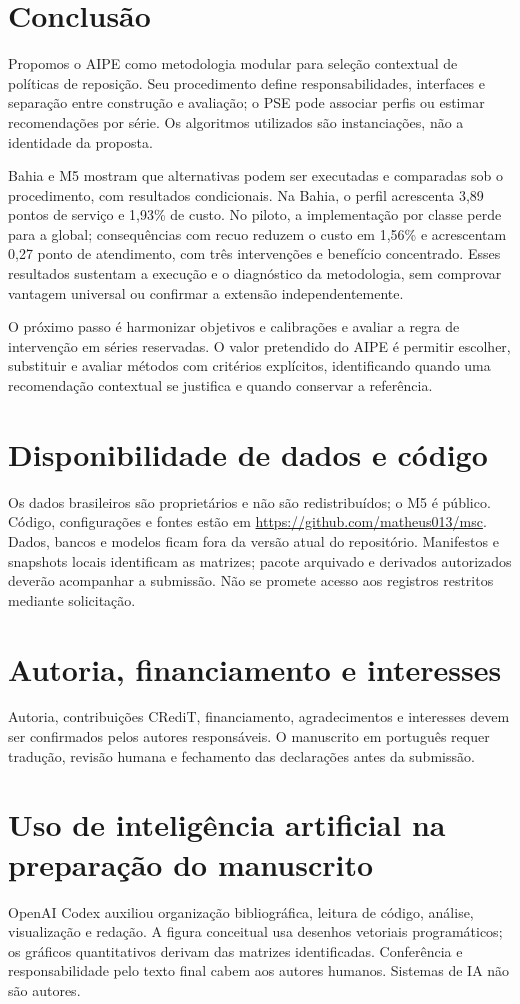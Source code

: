 \documentclass[preprint,12pt]{elsarticle}
\begin{document}
\section{Conclusão}
Propomos o AIPE como metodologia modular para seleção contextual de políticas de reposição. Seu procedimento define responsabilidades, interfaces e separação entre construção e avaliação; o PSE pode associar perfis ou estimar recomendações por série. Os algoritmos utilizados são instanciações, não a identidade da proposta.

Bahia e M5 mostram que alternativas podem ser executadas e comparadas sob o procedimento, com resultados condicionais. Na Bahia, o perfil acrescenta 3,89 pontos de serviço e 1,93\% de custo. No piloto, a implementação por classe perde para a global; consequências com recuo reduzem o custo em 1,56\% e acrescentam 0,27 ponto de atendimento, com três intervenções e benefício concentrado. Esses resultados sustentam a execução e o diagnóstico da metodologia, sem comprovar vantagem universal ou confirmar a extensão independentemente.

O próximo passo é harmonizar objetivos e calibrações e avaliar a regra de intervenção em séries reservadas. O valor pretendido do AIPE é permitir escolher, substituir e avaliar métodos com critérios explícitos, identificando quando uma recomendação contextual se justifica e quando conservar a referência.

\section*{Disponibilidade de dados e código}
Os dados brasileiros são proprietários e não são redistribuídos; o M5 é público. Código, configurações e fontes estão em \url{https://github.com/matheus013/msc}. Dados, bancos e modelos ficam fora da versão atual do repositório. Manifestos e snapshots locais identificam as matrizes; pacote arquivado e derivados autorizados deverão acompanhar a submissão. Não se promete acesso aos registros restritos mediante solicitação.

\section*{Autoria, financiamento e interesses}
Autoria, contribuições CRediT, financiamento, agradecimentos e interesses devem ser confirmados pelos autores responsáveis. O manuscrito em português requer tradução, revisão humana e fechamento das declarações antes da submissão.

\section*{Uso de inteligência artificial na preparação do manuscrito}
OpenAI Codex auxiliou organização bibliográfica, leitura de código, análise, visualização e redação. A figura conceitual usa desenhos vetoriais programáticos; os gráficos quantitativos derivam das matrizes identificadas. Conferência e responsabilidade pelo texto final cabem aos autores humanos. Sistemas de IA não são autores.



\end{document}
